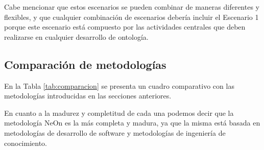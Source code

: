 Cabe mencionar que estos escenarios se pueden combinar de maneras diferentes y flexibles, y que cualquier combinación de escenarios debería incluir el Escenario 1 porque este escenario está compuesto por las actividades centrales que deben realizarse en cualquier desarrollo de ontología.  

\subsection{Comparación de metodologías}
En la Tabla \ref{tab:comparacion} se presenta un cuadro comparativo con las metodologías introducidas en las secciones anteriores. 

En cuanto a la madurez y completitud de cada una podemos decir que la metodología NeOn es la más completa y madura, ya que la misma está basada en metodologías de desarrollo de software y metodologías de ingeniería de conocimiento.


